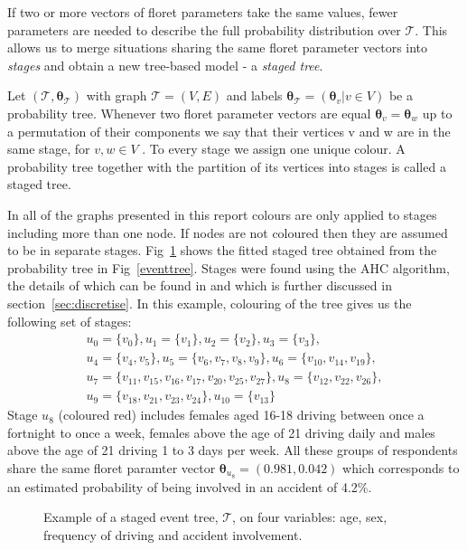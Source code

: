 \documentclass[runningheads]{llncs}
\begin{document}
If two or more vectors of floret parameters take the same values, fewer parameters are needed to describe the full probability distribution over $\mathcal{T}$. This allows us to merge situations sharing the same floret parameter vectors into \emph{stages} and obtain a new tree-based model - a \emph{staged tree}.
\begin{definition}
Let $(\mathcal{T} , \boldsymbol{\theta}_{\mathcal{T}})$ with graph $\mathcal{T} = (V, E)$ and labels $ \boldsymbol{\theta}_{\mathcal{T}} = ( \boldsymbol{\theta}_v | v \in V)$ be a probability tree. Whenever two floret parameter vectors are equal $\boldsymbol{\theta}_v = \boldsymbol{\theta}_w$ up to a permutation of their components we say that their vertices v and w are in the same stage, for $v, w \in V$ . To every stage we assign one unique colour. A probability tree together with the partition of its vertices into stages is called a staged tree.
\end{definition}
In all of the graphs presented in this report colours are only applied to stages including more than one node. If nodes are not coloured then they are assumed to be in separate stages. Fig~\ref{stagedtree} shows the fitted staged tree obtained from the probability tree in Fig~\ref{eventtree}. Stages were found using the AHC algorithm, the details of which can be found in \cite{freemansmith2011} and which is further discussed in section~\ref{sec:discretise}. In this example, colouring of the tree gives us the following set of stages:
\begin{gather*}
u_0 = \{v_0\}, u_1 = \{v_1\}, u_2 = \{v_2\}, u_3 = \{v_3\}, \\
u_4 = \{v_4, v_5\}, u_5 = \{v_6, v_7, v_8, v_9\}, u_6 = \{v_{10}, v_{14}, v_{19}\}, \\
u_7 = \{v_{11}, v_{15}, v_{16}, v_{17}, v_{20}, v_{25}, v_{27}\}, u_8 = \{v_{12}, v_{22}, v_{26}\}, \\ u_9 = \{v_{18}, v_{21}, v_{23}, v_{24}\}, u_{10} = \{v_{13}\}
\end{gather*}
Stage $u_{8}$ (coloured red) includes females aged 16-18 driving between once a fortnight to once a week, females above the age of 21 driving daily and males above the age of 21 driving 1 to 3 days per week. All these groups of respondents share the same floret paramter vector $\boldsymbol{\theta}_{u_8} = (0.981, 0.042)$ which corresponds to an estimated probability of being involved in an accident of 4.2\%. 
\begin{figure}
\centering

\caption{Example of a staged event tree, $\mathcal{T}$, on four variables: age, sex, frequency of driving and accident involvement.}
\label{stagedtree}
\end{figure}
\end{document}
